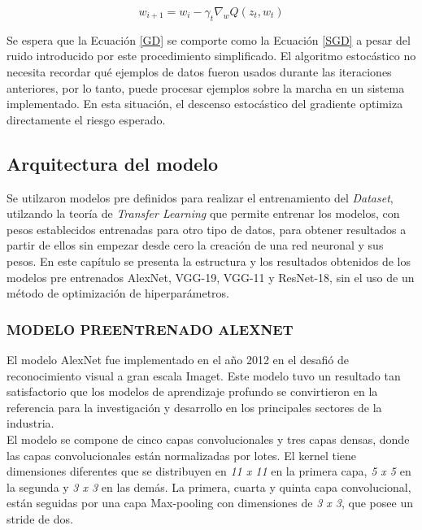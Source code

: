 			\begin{equation}
				{w_{i+1}=w_i-\gamma_t\nabla_w Q(z_t,w_t)}
				\label{SGD}
			\end{equation}
			
			Se espera que la Ecuación \ref{GD} se comporte como la Ecuación \ref{SGD} a pesar del ruido introducido por este procedimiento simplificado. El algoritmo estocástico no necesita recordar qué ejemplos de datos fueron usados durante las iteraciones anteriores, por lo tanto, puede procesar ejemplos sobre la marcha en un sistema implementado. En esta situación, el descenso estocástico del gradiente optimiza directamente el riesgo esperado.	
			
		\subsection{Arquitectura del modelo}
		
		Se utilzaron modelos pre definidos para realizar el entrenamiento del \textit{Dataset}, utilzando la teoría de \textit{Transfer Learning} que permite entrenar los modelos, con pesos establecidos entrenadas para otro tipo de datos, para obtener resultados a partir de ellos sin empezar desde cero la creación de una red neuronal y sus pesos. En este capítulo se presenta la estructura y los resultados obtenidos de los modelos pre entrenados AlexNet, VGG-19, VGG-11 y ResNet-18, sin el uso de un método de optimización de hiperparámetros.
		
			\subsubsection{\MakeUppercase{Modelo preentrenado ALEXNET}}
		
			El modelo AlexNet fue implementado en el año 2012 en el desafió de reconocimiento visual a gran escala Imaget. Este modelo tuvo un resultado tan satisfactorio que los modelos de aprendizaje profundo se convirtieron en la referencia para la investigación y desarrollo en los principales sectores de la industria. \cite{Pytorch}\\
			
			
			El modelo se compone de cinco capas convolucionales y tres capas densas, donde las capas convolucionales están normalizadas por lotes. El kernel tiene dimensiones diferentes que se distribuyen en \textit{11 x 11} en la primera capa, \textit{5 x 5} en la segunda y \textit{3 x 3} en las demás. La primera, cuarta y quinta capa convolucional, están seguidas por una capa Max-pooling con dimensiones de \textit{3 x 3}, que posee un stride de dos.\\
			
